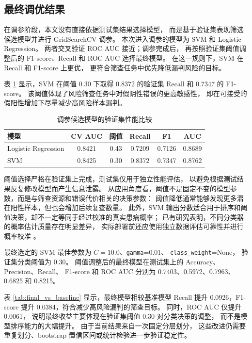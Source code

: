 \subsection{最终调优结果}

在调参阶段，本文没有直接依据测试集结果选择模型，
而是基于验证集表现筛选候选模型并进行 GridSearchCV 调参。
本次进入调参的模型为 SVM 和 Logistic Regression。
两者交叉验证 ROC AUC 接近；调参完成后，
再按照验证集阈值调整后的 F1-score、Recall 和 ROC AUC
选择最终模型。
在这一规则下，SVM 在 Recall 和 F1-score 上更优，
更符合筛查任务中优先降低漏判风险的目标。

表 \ref{tab:tuning_candidate_selection} 显示，SVM 在阈值 0.30 下取得
0.8372 的验证集 Recall 和 0.7347 的 F1-score。
该阈值体现了风险筛查任务中对假阴性错误的更高敏感性，
即在可接受的假阳性增加下尽量减少高风险样本漏判。

\begin{table}[H]
  \caption{调参候选模型的验证集性能比较}
  \label{tab:tuning_candidate_selection}
  \centering
  \scriptsize
  \setlength{\tabcolsep}{3pt}
  \begin{tabular*}{\linewidth}{@{\extracolsep{\fill}}lccccc@{}}
    \toprule
    模型 & CV AUC & 阈值 & Recall & F1 & AUC \\
    \midrule
    Logistic Regression & 0.8421 & 0.43 & 0.7209 & 0.7126 & 0.8689 \\
    SVM & 0.8425 & 0.30 & 0.8372 & 0.7347 & 0.8762 \\
    \bottomrule
  \end{tabular*}
\end{table}

阈值选择严格在验证集上完成，测试集仅用于独立性能评估，
以避免根据测试结果反复修改模型而产生信息泄露。
从应用角度看，阈值不是固定不变的模型参数，而是与筛查资源和错误代价相关的决策参数：
阈值降低通常能够发现更多潜在阳性样本，但也会增加后续复查数量。
此外，SVM 输出分数适合用于排序和阈值决策，却不一定等同于经过校准的真实患病概率；
已有研究表明，不同分类器的概率估计质量存在明显差异，
实际部署前还应使用独立数据评估可靠性并进行概率校准
\cite{niculescuMizilPredictingGoodProbabilities2005}。

最终选定的 SVM 最佳参数为 $C=10.0$、\texttt{gamma}=0.01、
\texttt{class\_weight}=None，
验证集分类阈值为 0.30。
阈值调整后的最终模型在测试集上的 Accuracy、Precision、Recall、
F1-score 和 ROC AUC 分别为 0.7403、0.5972、0.7963、0.6825 和 0.8215。

表 \ref{tab:final_vs_baseline} 显示，最终模型相较基准模型 Recall
提升 0.0926，F1-score 提升 0.0384，符合减少高风险漏判的筛查目标。
同时，ROC AUC 仅提升 0.0061，
说明最终收益主要体现在验证集阈值 0.30 对分类决策的调整，
而不是模型排序能力的大幅提升。
由于当前结果来自一次固定分层划分，
这些改进仍需要重复划分、bootstrap 置信区间或统计检验进一步验证稳定性。

